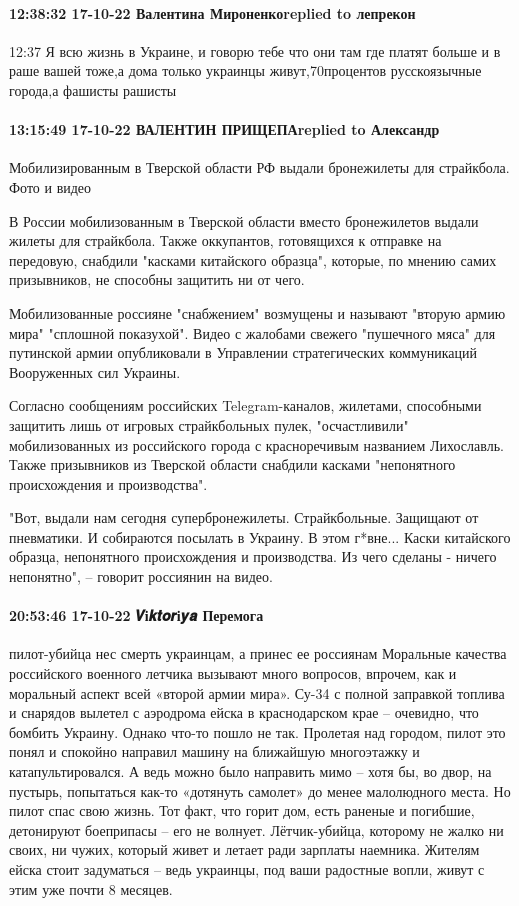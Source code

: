 \paragraph{12:38:32 17-10-22 Валентина Мироненкоreplied to лепрекон}
12:37
Я всю жизнь в Украине, и говорю тебе что они там где платят больше и в раше вашей тоже,а дома только украинцы живут,70процентов русскоязычные города,а фашисты рашисты


\paragraph{13:15:49 17-10-22 ВАЛЕНТИН ПРИЩЕПАreplied to Александр}

Мобилизированным в Тверской области РФ выдали бронежилеты для страйкбола. Фото
и видео

В России мобилизованным в Тверской области вместо бронежилетов выдали жилеты
для страйкбола. Также оккупантов, готовящихся к отправке на передовую, снабдили
"касками китайского образца", которые, по мнению самих призывников, не способны
защитить ни от чего.

Мобилизованные россияне "снабжением" возмущены и называют "вторую армию мира"
"сплошной показухой". Видео с жалобами свежего "пушечного мяса" для путинской
армии опубликовали в Управлении стратегических коммуникаций Вооруженных сил
Украины.

Согласно сообщениям российских Telegram-каналов, жилетами, способными защитить
лишь от игровых страйкбольных пулек, "осчастливили" мобилизованных из
российского города с красноречивым названием Лихославль. Также призывников из
Тверской области снабдили касками "непонятного происхождения и производства".

"Вот, выдали нам сегодня супербронежилеты. Страйкбольные. Защищают от
пневматики. И собираются посылать в Украину. В этом г*вне... Каски китайского
образца, непонятного происхождения и производства. Из чего сделаны - ничего
непонятно", – говорит россиянин на видео.

\paragraph{20:53:46 17-10-22 𝑽і𝒌𝒕𝒐𝒓і𝒚𝒂 Перемога}

пилот-убийца нес смерть украинцам, а принес ее россиянам
Моральные качества российского военного летчика вызывают много вопросов, впрочем, как и моральный аспект всей «второй армии мира».
Су-34 с полной заправкой топлива и снарядов вылетел с аэродрома ейска в краснодарском крае – очевидно, что бомбить Украину. Однако что-то пошло не так. Пролетая над городом, пилот это понял и спокойно направил машину на ближайшую многоэтажку и катапультировался.
А ведь можно было направить мимо – хотя бы, во двор, на пустырь, попытаться как-то «дотянуть самолет» до менее малолюдного места.
Но пилот спас свою жизнь. Тот факт, что горит дом, есть раненые и погибшие, детонируют боеприпасы – его не волнует. Лётчик-убийца, которому не жалко ни своих, ни чужих, который живет и летает ради зарплаты наемника.
Жителям ейска стоит задуматься – ведь украинцы, под ваши радостные вопли, живут с этим уже почти 8 месяцев.

